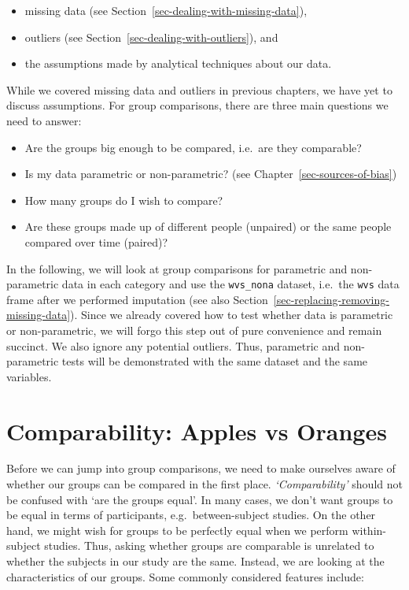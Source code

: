 \documentclass[
  letterpaper,
  DIV=11,
  numbers=noendperiod]{scrreprt}
\begin{document}
\begin{itemize}
\item
  missing data (see Section~\ref{sec-dealing-with-missing-data}),
\item
  outliers (see Section~\ref{sec-dealing-with-outliers}), and
\item
  the assumptions made by analytical techniques about our data.
\end{itemize}

While we covered missing data and outliers in previous chapters, we have
yet to discuss assumptions. For group comparisons, there are three main
questions we need to answer:

\begin{itemize}
\item
  Are the groups big enough to be compared, i.e.~are they comparable?
\item
  Is my data parametric or non-parametric? (see
  Chapter~\ref{sec-sources-of-bias})
\item
  How many groups do I wish to compare?
\item
  Are these groups made up of different people (unpaired) or the same
  people compared over time (paired)?
\end{itemize}

In the following, we will look at group comparisons for parametric and
non-parametric data in each category and use the \texttt{wvs\_nona}
dataset, i.e.~the \texttt{wvs} data frame after we performed imputation
(see also Section~\ref{sec-replacing-removing-missing-data}). Since we
already covered how to test whether data is parametric or
non-parametric, we will forgo this step out of pure convenience and
remain succinct. We also ignore any potential outliers. Thus, parametric
and non-parametric tests will be demonstrated with the same dataset and
the same variables.

\section{Comparability: Apples vs
Oranges}\label{sec-comparability-apples-vs-oranges}

Before we can jump into group comparisons, we need to make ourselves
aware of whether our groups can be compared in the first place.
\emph{`Comparability'} should not be confused with `are the groups
equal'. In many cases, we don't want groups to be equal in terms of
participants, e.g.~between-subject studies. On the other hand, we might
wish for groups to be perfectly equal when we perform within-subject
studies. Thus, asking whether groups are comparable is unrelated to
whether the subjects in our study are the same. Instead, we are looking
at the characteristics of our groups. Some commonly considered features
include:
\end{document}
